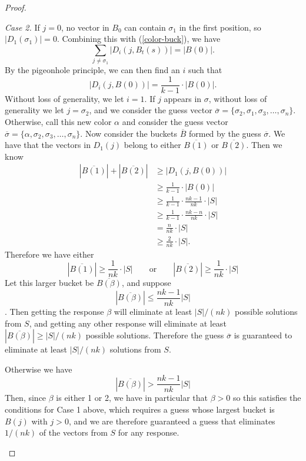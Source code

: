 \documentclass[12pt, a4paper]{article}
\begin{document}
\begin{proof}
\begin{enumerate}[label=\roman*.]
	
	\textit{Case 2.} If $j=0$, no vector in $B_0$ can contain $\sigma_1$ in the first position, so $|D_1(\sigma_1)| = 0$. 
	Combining this with (\ref{color-buck}), we have
	\begin{equation*}
	\sum_{j \neq \sigma_1} |D_i(j,B_t(s))| = |B(0)|.
	\end{equation*}
	By the pigeonhole principle, we can then find an $i$ such that
	\begin{equation*}
	|D_i(j,B(0))| = \frac{1}{k-1}\cdot|B(0)|.
	\end{equation*}
	Without loss of generality, we let $i = 1$. If $j$ appears in $\sigma$, without loss of generality we let $j = \sigma_2$, and
	we consider the guess vector
	$\overline{\sigma}=\{\sigma_2, \sigma_1, \sigma_3, \ldots, \sigma_n\}$.
	Otherwise, call this new color $\alpha$ and consider the guess vector
	$\overline{\sigma}=\{\alpha, \sigma_2, \sigma_3, \ldots, \sigma_n\}$.
	Now consider the
	buckets $\overline{B}$ formed by the guess $\overline{\sigma}$. 
	We have that the vectors in $D_1(j)$ belong to either $\overline{B(1)}$ or $\overline{B(2)}$.
	Then we know
	\begin{align*}
	|\overline{B(1)}|+|\overline{B(2)}| & \ge |D_1(j,B(0))|\\
	& \ge \frac{1}{k-1}\cdot |B(0)|\\
	& \ge \frac{1}{k-1}\cdot\frac{nk-1}{nk}\cdot|S|\\
	& \ge \frac{1}{k-1}\cdot\frac{nk-n}{nk}\cdot|S|\\
	& = \frac{n}{nk}\cdot|S|\\
	& \ge \frac{2}{nk}\cdot|S|.
	\end{align*}
	Therefore we have either
	\begin{equation*}
	|\overline{B(1)}|\ge\frac{1}{nk}\cdot|S|\qquad\text{or}
	\qquad|\overline{B(2)}|\ge\frac{1}{nk}\cdot|S|
	\end{equation*}
	Let this larger bucket be $\overline{B(\beta)}$, and suppose
	\begin{equation*}|\overline{B(\beta)}|\le\frac{nk-1}{nk}|S|\end{equation*}.
	Then getting the response $\beta$ will eliminate at least $|S|/(nk)$
	possible solutions from $S$, and getting any other response will
	eliminate at least $|\overline{B(\beta)}|\ge |S|/(nk)$ possible solutions. Therefore
	the guess $\overline{\sigma}$ is guaranteed to eliminate at least
	$|S|/(nk)$ solutions from $S$.
	
	Otherwise we have
	\begin{equation*}|\overline{B(\beta)}|>\frac{nk-1}{nk}|S|\end{equation*}
	Then, since $\beta$ is either 1 or 2, we have in particular that $\beta > 0$ so this satisfies the conditions for Case 1 above, which requires a
	guess whose largest bucket is $B(j)$ with $j>0$, and we are therefore guaranteed a guess that eliminates $1/(nk)$ of the vectors from $S$ for any response.
	\end{enumerate}
	
\end{proof}
\end{document}
